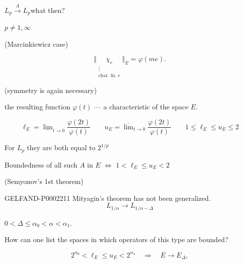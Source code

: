 $L_p\overset{A}{\longrightarrow}L_p$\qquad what then?

$p\ne1,\infty$

(Marcinkiewicz case)



\begin{equation*}
 \bigl\Vert\underset{\substack{\vert\\\text{char. fn. }e}}{\chi_e}\bigr\Vert_E=\varphi (me).
\end{equation*}



(symmetry is again necessary)



the resulting function $\varphi (t)$ — a characteristic of the space $E$.



\begin{equation*}
 \ell_E=\underline{\lim}_{t\to0}\frac{\varphi (2t)}{\varphi (t)}
 \qquad
 u_E=\overline{\lim}_{t\to0}\frac{\varphi (2t)}{\varphi (t)}
 \qquad 1\leq\ell_E\leq u_E\leq2
\end{equation*}





For $L_p$ they are both equal to $2^{1/p}$

Boundedness of all such $A$ in $E$ $\Longleftrightarrow$ $1<\ell_E\leq u_E<2$

(Semyonov's 1st theorem)



\begin{GelfandAdjacentEvidence}{GELFAND-P000221}{1}
Mityagin's theorem has not been generalized.
\begin{equation*}
 L_{1/\alpha}\longrightarrow L_{1/\alpha-\Delta}
\end{equation*}
\end{GelfandAdjacentEvidence}

$0<\Delta\leq\alpha_0<\alpha<\alpha_1$.



How can one list the spaces in which operators of this type are bounded?



\begin{equation*}
 2^{\alpha_0}<\ell_E\leq u_E<2^{\alpha_1}\quad\Longrightarrow\quad E\longrightarrow E_\Delta,
\end{equation*}



